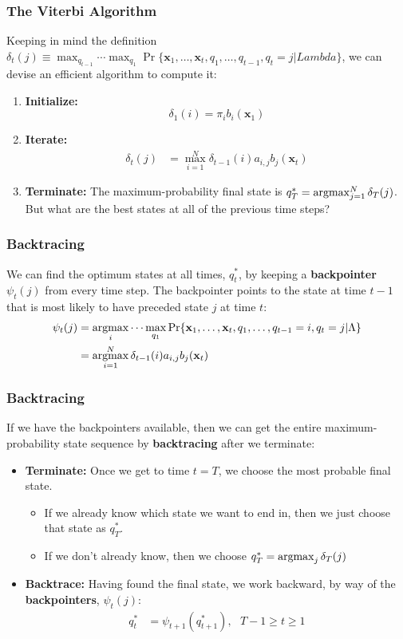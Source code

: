 \documentclass{beamer}
\newcommand{\argmax}{\operatornamewithlimits{argmax}}
\begin{document}
\begin{frame}
  \frametitle{The Viterbi Algorithm}
  Keeping in mind the definition
  $\delta_t(j)\equiv\max_{q_{t-1}}\cdots\max_{q_1}\Pr\{\mathbf{x}_1,\ldots,\mathbf{x}_t,q_1,\ldots,q_{t-1},q_t=j|Lambda\}$,
  we can devise an efficient algorithm to compute it:
  \begin{enumerate}
  \item {\bf Initialize:}
    \[
    \delta_1(i) = \pi_i b_i(\mathbf{x}_1)
    \]
  \item {\bf Iterate:}
    \begin{align*}
      \delta_{t}(j) &= \max_{i=1}^N \delta_{t-1}(i) a_{i,j}b_j(\mathbf{x}_t)
    \end{align*}
  \item {\bf Terminate:}
    The maximum-probability final state is $q_T^* = \argmax_{j=1}^N \delta_T(j)$.  But what
    are the best states at all of the previous time steps?
  \end{enumerate}
\end{frame}

\begin{frame}
  \frametitle{Backtracing}

  We can find the optimum states at all times, $q_t^*$, by keeping a
  {\bf backpointer} $\psi_t(j)$ from every time step.  The backpointer
  points to the state at time $t-1$ that is most likely to have
  preceded state $j$ at time $t$:
  \begin{align*}
    \psi_{t}(j) &= \argmax_i\cdots\max_{q_1}\Pr\{\mathbf{x}_1,\ldots,\mathbf{x}_t,q_1,\ldots,q_{t-1}=i,q_t=j|\Lambda\}\\
   &= \argmax_{i=1}^N \delta_{t-1}(i) a_{i,j}b_j(\mathbf{x}_t)
  \end{align*}
\end{frame}

\begin{frame}
  \frametitle{Backtracing}

  If we have the backpointers available, then we can get the entire
  maximum-probability state sequence by {\bf backtracing} after we
  terminate:
  \begin{itemize}
  \item {\bf Terminate:} Once we get to time $t=T$, we choose the most
    probable final state.
    \begin{itemize}
    \item If we already know which state we want to end in, then we
      just choose that state as $q_T^*$.
    \item If we don't already know, then we choose
      $q_T^*=\argmax_{j}\delta_T(j)$
    \end{itemize}
  \item {\bf Backtrace:} Having found the final state, we work
    backward, by way of the {\bf backpointers}, $\psi_t(j)$:
    \begin{align*}
      q_t^* &= \psi_{t+1}\left(q_{t+1}^*\right),~~~T-1\ge t\ge 1
    \end{align*}
  \end{itemize}
\end{frame}
\end{document}

